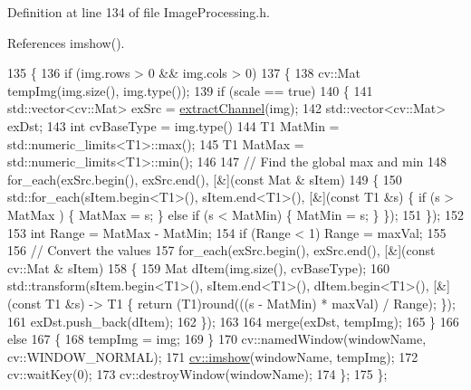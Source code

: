 Definition at line 134 of file Image\+Processing.\+h.



References imshow().


\begin{DoxyCode}
135         \{
136             \textcolor{keywordflow}{if} (img.rows > 0 && img.cols > 0)
137             \{
138                 cv::Mat tempImg(img.size(), img.type());
139                 \textcolor{keywordflow}{if} (scale == \textcolor{keyword}{true})
140                 \{
141                     std::vector<cv::Mat> exSrc = \hyperlink{class_vision_1_1_image_processing_ad5fa51caaabb8cb0fc2c15f645695a3c}{extractChannel}(img);
142                     std::vector<cv::Mat> exDst;
143                     \textcolor{keywordtype}{int} cvBaseType = img.type() %
144                     T1 MatMin = std::numeric\_limits<T1>::max();
145                     T1 MatMax = std::numeric\_limits<T1>::min();
146 
147                     \textcolor{comment}{// Find the global max and min}
148                     for\_each(exSrc.begin(), exSrc.end(), [&](\textcolor{keyword}{const} Mat & sItem)
149                     \{
150                         std::for\_each(sItem.begin<T1>(), sItem.end<T1>(), [&](\textcolor{keyword}{const} T1 &s) \{ if (s > MatMax
      ) \{ MatMax = s; \} \textcolor{keywordflow}{else} if (s < MatMin) \{ MatMin = s; \} \});
151                     \});
152 
153                     \textcolor{keywordtype}{int} Range = MatMax - MatMin;
154                     \textcolor{keywordflow}{if} (Range < 1) Range = maxVal;
155 
156                     \textcolor{comment}{// Convert the values}
157                     for\_each(exSrc.begin(), exSrc.end(), [&](\textcolor{keyword}{const} cv::Mat & sItem)
158                     \{
159                         Mat dItem(img.size(), cvBaseType);
160                         std::transform(sItem.begin<T1>(), sItem.end<T1>(), dItem.begin<T1>(), [&](\textcolor{keyword}{const} T1 
      &s) -> T1 \{ return (T1)round(((s - MatMin) * maxVal) / Range); \});
161                         exDst.push\_back(dItem);
162                     \});
163 
164                     merge(exDst, tempImg);
165                 \}
166                 \textcolor{keywordflow}{else}
167                 \{
168                     tempImg = img;
169                 \}
170                 cv::namedWindow(windowName, cv::WINDOW\_NORMAL);
171                 \hyperlink{_comparision_pictures_2_createtest_image_8m_ab203292116da4a8a72763ec58b04da8f}{cv::imshow}(windowName, tempImg);
172                 cv::waitKey(0);
173                 cv::destroyWindow(windowName);
174             \};
175         \};
\end{DoxyCode}


